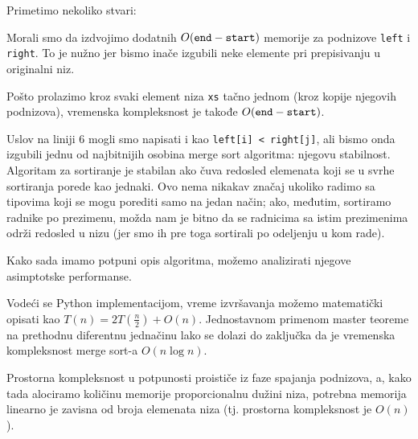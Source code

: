 \documentclass[a4paper,11pt]{article}
\begin{document}
    Primetimo nekoliko stvari:
    \begin{itemize}
        \begin{item}
            Morali smo da izdvojimo dodatnih $O(\verb|end| - \verb|start|)$ memorije za podnizove \verb|left| i \verb|right|.
            To je nužno jer bismo inače izgubili neke elemente pri prepisivanju u originalni niz.
        \end{item}
        \begin{item}
            Pošto prolazimo kroz svaki element niza \verb|xs| tačno jednom (kroz kopije njegovih podnizova),
            vremenska kompleksnost je takođe $O(\verb|end| - \verb|start|)$.
        \end{item}
        \begin{item}
            Uslov na liniji 6 mogli smo napisati i kao \verb|left[i] < right[j]|, ali bismo
            onda izgubili jednu od najbitnijih osobina merge sort algoritma: njegovu stabilnost. Algoritam
            za sortiranje je stabilan ako čuva redosled elemenata koji se u svrhe sortiranja porede kao
            jednaki. Ovo nema nikakav značaj ukoliko radimo sa tipovima koji se mogu porediti samo na jedan
            način; ako, međutim, sortiramo radnike po prezimenu, možda nam je bitno da se radnicima sa istim prezimenima
            održi redosled u nizu (jer smo ih pre toga sortirali po odeljenju u kom rade).
        \end{item}
    \end{itemize}
    Kako sada imamo potpuni opis algoritma, možemo analizirati njegove asimptotske performanse.\par
    Vodeći se Python implementacijom, vreme izvršavanja možemo matematički opisati kao 
    $T(n) = 2T(\frac{n}{2}) + O(n)$. Jednostavnom primenom master teoreme na prethodnu
    diferentnu jednačinu lako se dolazi do zaključka da je vremenska kompleksnost merge sort-a $O(n \log n)$.\par
    Prostorna kompleksnost u potpunosti proističe iz faze spajanja podnizova, a, kako tada alociramo
    količinu memorije proporcionalnu dužini niza, potrebna memorija linearno je zavisna od broja elemenata niza
    (tj. prostorna kompleksnost je $O(n)$).\par
    \newpage
    
\end{document}

